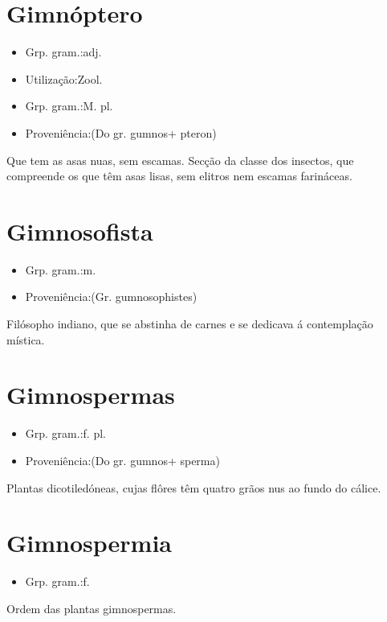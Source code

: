\section{Gimnóptero}
\begin{itemize}
\item {Grp. gram.:adj.}
\end{itemize}
\begin{itemize}
\item {Utilização:Zool.}
\end{itemize}
\begin{itemize}
\item {Grp. gram.:M. pl.}
\end{itemize}
\begin{itemize}
\item {Proveniência:(Do gr. \textunderscore gumnos\textunderscore  + \textunderscore pteron\textunderscore )}
\end{itemize}
Que tem as asas nuas, sem escamas.
Secção da classe dos insectos, que compreende os que têm asas lisas, sem elitros nem escamas farináceas.
\section{Gimnosofista}
\begin{itemize}
\item {Grp. gram.:m.}
\end{itemize}
\begin{itemize}
\item {Proveniência:(Gr. \textunderscore gumnosophistes\textunderscore )}
\end{itemize}
Filósopho indiano, que se abstinha de carnes e se dedicava á contemplação mística.
\section{Gimnospermas}
\begin{itemize}
\item {Grp. gram.:f. pl.}
\end{itemize}
\begin{itemize}
\item {Proveniência:(Do gr. \textunderscore gumnos\textunderscore  + \textunderscore sperma\textunderscore )}
\end{itemize}
Plantas dicotiledóneas, cujas flôres têm quatro grãos nus ao fundo do cálice.
\section{Gimnospermia}
\begin{itemize}
\item {Grp. gram.:f.}
\end{itemize}
Ordem das plantas gimnospermas.
